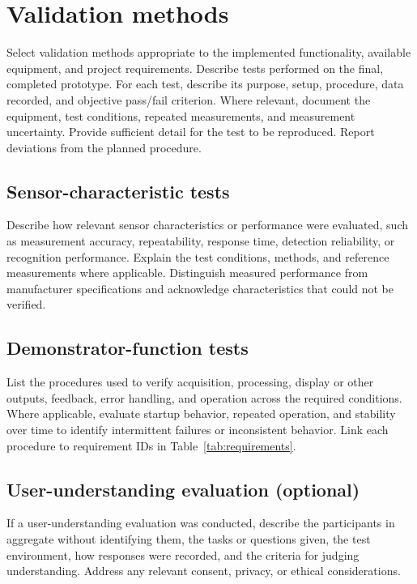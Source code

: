 \chapter{Validation methods}
\label{sec:testing}

Select validation methods appropriate to the implemented functionality,
available equipment, and project requirements. Describe tests performed on
the final, completed prototype. For each test, describe its purpose, setup,
procedure, data recorded, and objective pass/fail criterion. Where relevant,
document the equipment, test conditions, repeated measurements, and
measurement uncertainty. Provide sufficient detail for the test to be
reproduced. Report deviations from the planned procedure.

\section{Sensor-characteristic tests}

Describe how relevant sensor characteristics or performance were evaluated,
such as measurement accuracy, repeatability, response time, detection
reliability, or recognition performance. Explain the test conditions,
methods, and reference measurements where applicable. Distinguish measured
performance from manufacturer specifications and acknowledge characteristics
that could not be verified.

\section{Demonstrator-function tests}

List the procedures used to verify acquisition, processing, display or other
outputs, feedback, error handling, and operation across the required
conditions. Where applicable, evaluate startup behavior, repeated operation,
and stability over time to identify intermittent failures or inconsistent
behavior. Link each procedure to requirement IDs in
Table~\ref{tab:requirements}.

\section{User-understanding evaluation (optional)}

If a user-understanding evaluation was conducted, describe the participants
in aggregate without identifying them, the tasks or questions given, the test
environment, how responses were recorded, and the criteria for judging
understanding. Address any relevant consent, privacy, or ethical considerations.